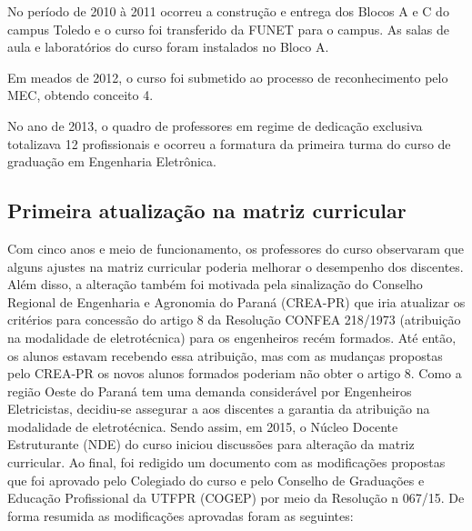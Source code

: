 
No período de 2010 à 2011 ocorreu a construção e entrega dos Blocos A e C do campus Toledo e o curso foi transferido da FUNET para o campus. As salas de aula e laboratórios do curso foram instalados no Bloco A.

Em meados de 2012, o curso foi submetido ao processo de reconhecimento pelo MEC, obtendo conceito 4.

No ano de 2013, o quadro de professores em regime de dedicação exclusiva totalizava 12 profissionais e ocorreu a formatura da primeira turma do curso de graduação em Engenharia Eletrônica.

\subsection{Primeira atualização na matriz curricular}

Com cinco anos e meio de funcionamento, os professores do curso observaram que alguns ajustes na matriz curricular poderia melhorar  o desempenho dos discentes. Além disso, a alteração também foi motivada pela sinalização do Conselho Regional de Engenharia e Agronomia do Paraná (CREA-PR) que iria atualizar os critérios para concessão do artigo 8\textordmasculine{} da Resolução CONFEA 218/1973 (atribuição na modalidade de eletrotécnica) para os engenheiros recém formados. Até então, os alunos estavam recebendo essa atribuição, mas com as mudanças propostas pelo CREA-PR os novos alunos formados poderiam não obter o artigo 8\textordmasculine{}. Como a região Oeste do Paraná tem uma demanda considerável por Engenheiros Eletricistas, decidiu-se assegurar a aos discentes a garantia da atribuição na modalidade de eletrotécnica. Sendo assim, em 2015, o Núcleo Docente Estruturante (NDE) do curso iniciou discussões para alteração da matriz curricular. Ao final, foi redigido um documento com as modificações propostas que foi aprovado pelo Colegiado do curso e pelo Conselho de Graduações e Educação Profissional da UTFPR (COGEP) por meio da Resolução n\textordmasculine{} 067/15. De forma resumida as modificações aprovadas foram as seguintes:


